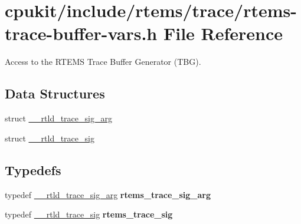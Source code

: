 \hypertarget{rtems-trace-buffer-vars_8h}{}\section{cpukit/include/rtems/trace/rtems-\/trace-\/buffer-\/vars.h File Reference}
\label{rtems-trace-buffer-vars_8h}


Access to the R\+T\+E\+MS Trace Buffer Generator (T\+BG).  


\subsection*{Data Structures}
\begin{DoxyCompactItemize}
\item 
struct \mbox{\hyperlink{struct____rtld__trace__sig__arg}{\+\_\+\+\_\+rtld\+\_\+trace\+\_\+sig\+\_\+arg}}
\item 
struct \mbox{\hyperlink{struct____rtld__trace__sig}{\+\_\+\+\_\+rtld\+\_\+trace\+\_\+sig}}
\end{DoxyCompactItemize}
\subsection*{Typedefs}
\begin{DoxyCompactItemize}
\item 
\mbox{\label{rtems-trace-buffer-vars_8h_a673f82e2fb5f568bfa533214f8733fbe}} 
typedef \mbox{\hyperlink{struct____rtld__trace__sig__arg}{\+\_\+\+\_\+rtld\+\_\+trace\+\_\+sig\+\_\+arg}} {\bfseries rtems\+\_\+trace\+\_\+sig\+\_\+arg}
\item 
\mbox{\label{rtems-trace-buffer-vars_8h_a8519b06b490dd10306be4a05336b8f6d}} 
typedef \mbox{\hyperlink{struct____rtld__trace__sig}{\+\_\+\+\_\+rtld\+\_\+trace\+\_\+sig}} {\bfseries rtems\+\_\+trace\+\_\+sig}
\end{DoxyCompactItemize}
